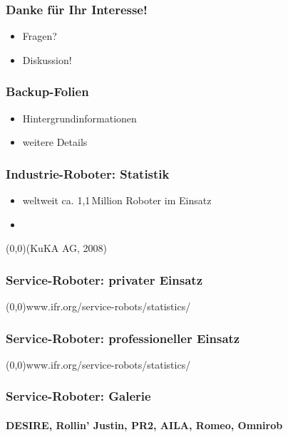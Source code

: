 \documentclass[t]{beamer}
\def\quelle#1{{\tiny \makebox(0,0){}\vfill\hfill #1}}
\def\ii{\item[]}
\begin{document}
\begin{frame}
\frametitle{Danke für Ihr Interesse!}
\begin{itemize}
\item Fragen?
\item Diskussion!
\end{itemize}
\end{frame}


\begin{frame}
\frametitle{Backup-Folien}
\begin{itemize}
\item Hintergrundinformationen
\item weitere Details
\end{itemize}
\end{frame}


\begin{frame}
\frametitle{Industrie-Roboter: Statistik}
\vspace*{-5mm}
\strut
\begin{itemize}
\item weltweit ca. 1,1\,Million Roboter im Einsatz
\ii
\end{itemize}
\vspace*{45mm}
\quelle{(KuKA AG, 2008)}
\end{frame}


\begin{frame}
\frametitle{Service-Roboter: privater Einsatz}
\quelle{www.ifr.org/service-robots/statistics/}
\end{frame}


\begin{frame}
\frametitle{Service-Roboter: professioneller Einsatz}
\quelle{www.ifr.org/service-robots/statistics/}
\end{frame}




\begin{frame}
\frametitle{Service-Roboter: Galerie}
\framesubtitle{DESIRE, Rollin' Justin, PR2, AILA, Romeo, Omnirob}
\end{frame}
\end{document}

